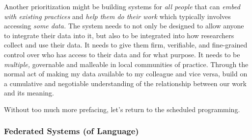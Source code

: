 \documentclass[10pt]{article}
\begin{document}
\begin{multicols}{2}
Another prioritization might be building systems for \emph{all people}
that can \emph{embed with existing practices} and \emph{help them do
their work} which typically involves accessing \emph{some data.} The
system needs to not only be designed to allow anyone to integrate their
data into it, but also to be integrated into how researchers collect and
use their data. It needs to give them firm, verifiable, and fine-grained
control over who has access to their data and for what purpose. It needs
to be \emph{multiple,} governable and malleable in local communities of
practice. Through the normal act of making my data available to my
colleague and vice versa, build on a cumulative and negotiable
understanding of the relationship between our work and its meaning.

Without too much more prefacing, let's return to the scheduled
programming. 
\end{multicols}


\hypertarget{federated-systems-of-language}{%
\subsubsection{Federated Systems (of
Language)}\label{federated-systems-of-language}}
\end{document}
